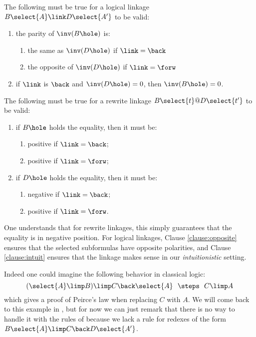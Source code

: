 \begin{condition}[Polarity]\label{cond:pol}
  
  The following must be true for a logical linkage
  $B\select{A}\link D\select{A'}$ to be valid:
  \begin{enumerate}
    \item the parity of $\inv(B\hole)$ is:
      \begin{enumerate}
        \item the same as $\inv(D\hole)$ if $\link = \back$
        \item the opposite of $\inv(D\hole)$ if $\link = \forw$
      \end{enumerate}\label{clause:opposite}
    \item if $\link$ is $\back$ and $\inv(D\hole) = 0$, then $\inv(B\hole) =
    0$\label{clause:intuit}.
  \end{enumerate}

  The following must be true for a rewrite linkage $B\select{t} @ D\select{t'}$
  to be valid:
  \begin{enumerate}
    \item if $B\hole$ holds the equality, then it must be:
      \begin{enumerate}
        \item positive if $\link = \back$;
        \item positive if $\link = \forw$;
      \end{enumerate}
    \item if $D\hole$ holds the equality, then it must be:
      \begin{enumerate} 
        \item negative if $\link = \back$;
        \item positive if $\link = \forw$.
      \end{enumerate}
  \end{enumerate}
\end{condition}

One understands that for rewrite linkages, this simply guarantees that the
equality is in negative position. For logical linkages, Clause
\ref{clause:opposite} ensures that the selected subformulas have opposite
polarities, and Clause \ref{clause:intuit} ensures that the linkage makes sense
in our \emph{intuitionistic} setting.

Indeed one could imagine the following behavior
in classical logic:
$$(\select{A}\limp B)\limp C\back \select{A}~~\steps~~ C\limp A$$ which gives a
proof of Peirce's law when replacing $C$ with $A$. We will come back to this
example in , but for now we can just remark that there is
no way to handle it with the rules of  because we lack a rule for
redexes of the form $B\select{A} \limp C \back D\select{A'}$.

